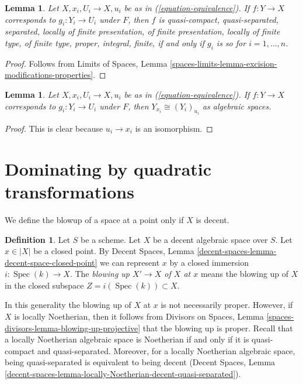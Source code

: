 \documentclass{stacks-project}
\theoremstyle{plain}
\newtheorem{lemma}[subsection]{Lemma}
\theoremstyle{definition}
\newtheorem{definition}[subsection]{Definition}
\theoremstyle{remark}
\numberwithin{equation}{subsection}
\def\Spec{\mathop{\mathrm{Spec}}}
\begin{document}
\begin{lemma}
\label{lemma-equivalence-properties}
Let $X, x_i, U_i \to X, u_i$ be as in (\ref{equation-equivalence}).
If $f : Y \to X$ corresponds to $g_i : Y_i \to U_i$ under $F$,
then $f$ is quasi-compact, quasi-separated, separated, locally of finite
presentation, of finite presentation, locally of finite type, of finite type,
proper, integral, finite, if and only if $g_i$ is so
for $i = 1, \ldots, n$.
\end{lemma}

\begin{proof}
Follows from Limits of Spaces, Lemma
\ref{spaces-limits-lemma-excision-modifications-properties}.
\end{proof}

\begin{lemma}
\label{lemma-equivalence-fibre}
Let $X, x_i, U_i \to X, u_i$ be as in (\ref{equation-equivalence}).
If $f : Y \to X$ corresponds to $g_i : Y_i \to U_i$ under $F$,
then $Y_{x_i} \cong (Y_i)_{u_i}$ as algebraic spaces.
\end{lemma}

\begin{proof}
This is clear because $u_i \to x_i$ is an isomorphism.
\end{proof}







\section{Dominating by quadratic transformations}
\label{section-quadratic-spaces}

\noindent
We define the blowup of a space at a point only if $X$ is decent.

\begin{definition}
\label{definition-blowup-at-point}
Let $S$ be a scheme. Let $X$ be a decent algebraic space over $S$.
Let $x \in |X|$ be a closed point. By
Decent Spaces, Lemma \ref{decent-spaces-lemma-decent-space-closed-point}
we can represent $x$ by a closed immersion $i : \Spec(k) \to X$.
The {\it blowing up $X' \to X$ of $X$ at $x$} means the blowing up of $X$
in the closed subspace $Z = i(\Spec(k)) \subset X$.
\end{definition}

\noindent
In this generality the blowing up of $X$ at $x$ is not necessarily proper.
However, if $X$ is locally Noetherian, then it follows from
Divisors on Spaces, Lemma \ref{spaces-divisors-lemma-blowing-up-projective}
that the blowing up is proper.
Recall that a locally Noetherian algebraic space is Noetherian if
and only if it is quasi-compact and quasi-separated. Moreover, for
a locally Noetherian algebraic space, being quasi-separated is
equivalent to being decent (Decent Spaces, Lemma
\ref{decent-spaces-lemma-locally-Noetherian-decent-quasi-separated}).
\end{document}
